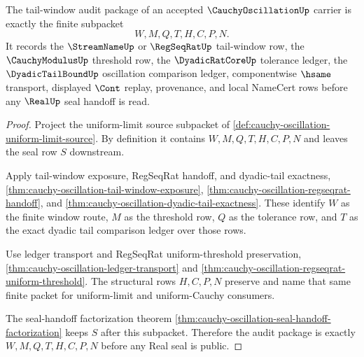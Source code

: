 \begin{theorem}
\label{thm:cauchy-oscillation-tail-window-audit-package}
The tail-window audit package of an accepted $\CauchyOscillationUp$ carrier is exactly the finite subpacket
$$
W,M,Q,T,H,C,P,N.
$$
It records the $\StreamNameUp$ or $\RegSeqRatUp$ tail-window row, the $\CauchyModulusUp$ threshold row, the $\DyadicRatCoreUp$ tolerance ledger, the $\DyadicTailBoundUp$ oscillation comparison ledger, componentwise $\hsame$ transport, displayed $\Cont$ replay, provenance, and local NameCert rows before any $\RealUp$ seal handoff is read.
\end{theorem}
\begin{proof}
Project the uniform-limit source subpacket of \autoref{def:cauchy-oscillation-uniform-limit-source}. By definition it contains $W,M,Q,T,H,C,P,N$ and leaves the seal row $S$ downstream.

Apply tail-window exposure, RegSeqRat handoff, and dyadic-tail exactness, \autoref{thm:cauchy-oscillation-tail-window-exposure}, \autoref{thm:cauchy-oscillation-regseqrat-handoff}, and \autoref{thm:cauchy-oscillation-dyadic-tail-exactness}. These identify $W$ as the finite window route, $M$ as the threshold row, $Q$ as the tolerance row, and $T$ as the exact dyadic tail comparison ledger over those rows.

Use ledger transport and RegSeqRat uniform-threshold preservation, \autoref{thm:cauchy-oscillation-ledger-transport} and \autoref{thm:cauchy-oscillation-regseqrat-uniform-threshold}. The structural rows $H,C,P,N$ preserve and name that same finite packet for uniform-limit and uniform-Cauchy consumers.

The seal-handoff factorization theorem \autoref{thm:cauchy-oscillation-seal-handoff-factorization} keeps $S$ after this subpacket. Therefore the audit package is exactly $W,M,Q,T,H,C,P,N$ before any Real seal is public.
\end{proof}

